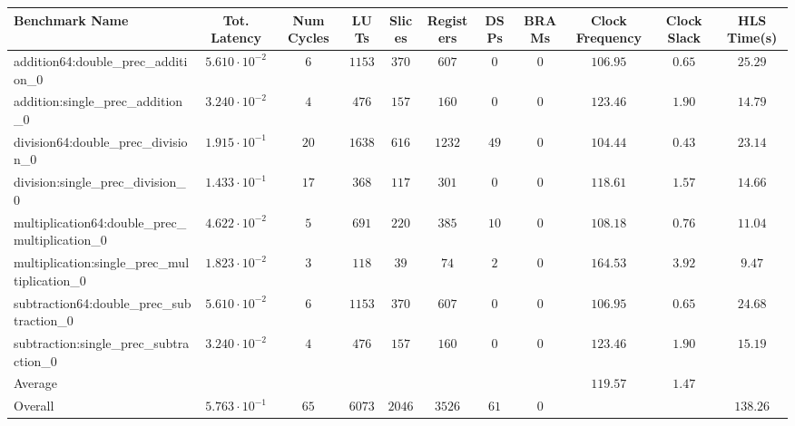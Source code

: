 \begin{tabular}{|l|c|c|c|c|c|c|c|c|c|c|}
\hline
Benchmark Name                                   & Tot. Latency            & Num Cycles & LUTs     & Slices   & Registers & DSPs   & BRAMs & Clock Frequency & Clock Slack & HLS Time(s) \\
\hline
addition64:double\_prec\_addition\_0             & $ 5.610 \cdot 10^{-2} $ & $ 6      $ & $ 1153 $ & $ 370  $ & $ 607   $ & $ 0  $ & $ 0 $ & $ 106.95      $ & $ 0.65    $ & $ 25.29   $ \\
addition:single\_prec\_addition\_0               & $ 3.240 \cdot 10^{-2} $ & $ 4      $ & $ 476  $ & $ 157  $ & $ 160   $ & $ 0  $ & $ 0 $ & $ 123.46      $ & $ 1.90    $ & $ 14.79   $ \\
division64:double\_prec\_division\_0             & $ 1.915 \cdot 10^{-1} $ & $ 20     $ & $ 1638 $ & $ 616  $ & $ 1232  $ & $ 49 $ & $ 0 $ & $ 104.44      $ & $ 0.43    $ & $ 23.14   $ \\
division:single\_prec\_division\_0               & $ 1.433 \cdot 10^{-1} $ & $ 17     $ & $ 368  $ & $ 117  $ & $ 301   $ & $ 0  $ & $ 0 $ & $ 118.61      $ & $ 1.57    $ & $ 14.66   $ \\
multiplication64:double\_prec\_multiplication\_0 & $ 4.622 \cdot 10^{-2} $ & $ 5      $ & $ 691  $ & $ 220  $ & $ 385   $ & $ 10 $ & $ 0 $ & $ 108.18      $ & $ 0.76    $ & $ 11.04   $ \\
multiplication:single\_prec\_multiplication\_0   & $ 1.823 \cdot 10^{-2} $ & $ 3      $ & $ 118  $ & $ 39   $ & $ 74    $ & $ 2  $ & $ 0 $ & $ 164.53      $ & $ 3.92    $ & $ 9.47    $ \\
subtraction64:double\_prec\_subtraction\_0       & $ 5.610 \cdot 10^{-2} $ & $ 6      $ & $ 1153 $ & $ 370  $ & $ 607   $ & $ 0  $ & $ 0 $ & $ 106.95      $ & $ 0.65    $ & $ 24.68   $ \\
subtraction:single\_prec\_subtraction\_0         & $ 3.240 \cdot 10^{-2} $ & $ 4      $ & $ 476  $ & $ 157  $ & $ 160   $ & $ 0  $ & $ 0 $ & $ 123.46      $ & $ 1.90    $ & $ 15.19   $ \\
\hline
Average                                          & $                     $ & $        $ & $      $ & $      $ & $       $ & $    $ & $   $ & $ 119.57      $ & $ 1.47    $ & $         $ \\
\hline
Overall                                          & $ 5.763 \cdot 10^{-1} $ & $ 65     $ & $ 6073 $ & $ 2046 $ & $ 3526  $ & $ 61 $ & $ 0 $ & $             $ & $         $ & $ 138.26  $ \\
\hline
\end{tabular}
